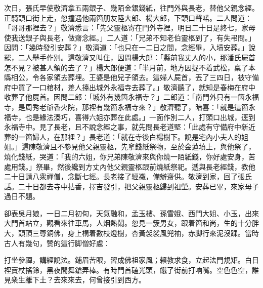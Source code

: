 次日，張氏早使敬濟拿五兩銀子、幾陌金銀錢紙，往門外與長老，替他父親念經。正騎頭口街上走，忽撞遇他兩箇朋友陸大郎、楊大郎，下頭口聲喏。二人問道：「哥哥那裡去？」敬濟悉言：「先父靈柩寄在門外寺裡，明日二十日是終七，家母使我送銀子與長老，做齋念經。」二人道：「兄弟不知老伯靈柩到了，有失弔問。」因問：「幾時發引安葬？」敬濟道：「也只在一二日之間，念經畢，入墳安葬。」說罷，二人舉手作別。這敬濟又叫住，因問楊大郎：「縣前我丈人的小，那潘氏屍首怎不見？被甚人領的去了？」楊大郎便道：「半月前，地方因捉不着武松，稟了本縣相公，令各家領去葬埋。王婆是他兒子領去。這婦人屍首，丟了三四日，被守備府中買了一口棺材，差人擡出城外永福寺去葬了。」敬濟聽了，就知是春梅在府中收葬了他屍首。因問二郎：「城外有幾箇永福寺？」二郎道：「南門外只有一箇永福寺，是周秀老爺香火院，那裡有幾箇永福寺來？」敬濟聽了，暗喜：「就是這箇永福寺，也是緣法湊巧，喜得六姐亦葬在此處。」一面作別二人，打頭口出城，逕到永福寺中。見了長老，且不說念經之事，就先問長老道堅：「此處有守備府中新近葬的一箇婦人，在那裡？」長老道：「就在寺後白楊樹下。說是宅內小夫人的姐姐。」這陳敬濟且不參見他父親靈柩，{}先拿錢紙祭物，至於金蓮墳上，與他祭了，燒化錢紙，哭道：「我的六姐，你兄弟陳敬濟來與你燒一陌紙錢，你好處安身，苦處用錢。」祭畢，然後纔到方丈內他父親靈柩跟前燒紙祭祀。遞與長老經錢，教他二十日請八衆禪僧，念斷七經。長老接了經襯，備辦齋供。敬濟到家，回了張氏話。二十日都去寺中拈香，擇吉發引，把父親靈柩歸到祖塋。安葬已畢，來家母子過日不題。

卻表吳月娘，一日二月初旬，天氣融和，孟玉樓、孫雪娥、西門大姐、小玉，出來大門首站立，觀看來往車馬，人烟熱鬧。忽見一簇男女，跟着箇和尚，生的十分胖大，頭頂三尊銅佛，身上構着數枝燈樹，杏黃袈裟風兜袖，赤脚行來泥沒踝。當時古人有幾句，赞的這行脚僧好處：

\begin{myquote}
打坐參禪，講經說法。鋪眉苦眼，習成佛祖家風；賴教求食，立起法門規矩。白日裡賣杖搖鈴，黑夜間舞鎗弄棒。有時門首磕光頭，餓了街前打响嘴。空色色空，誰見衆生離下土？去來來去，何曾接引到西方。
\end{myquote}

